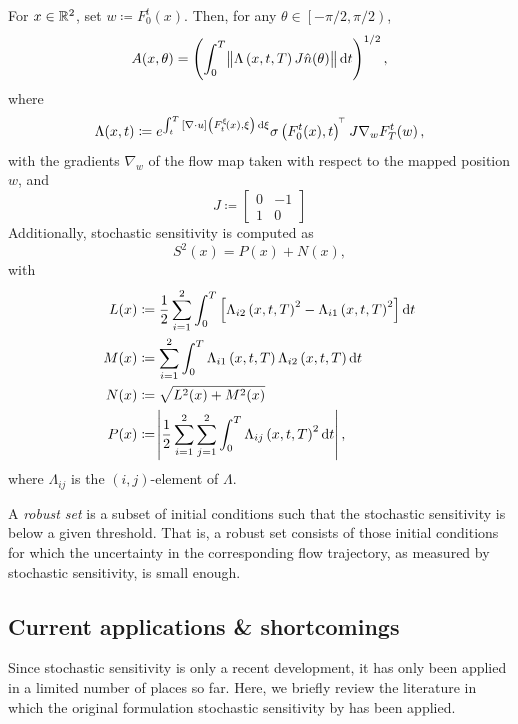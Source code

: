 \begin{theorem}\label{thm:orig_s2_calculation}
	For \(x \in \mathbb{R}^2\), set \(w \coloneqq F_0^t(x)\).
	Then, for any \(\theta \in \left[-\pi/2, \pi/2\right)\),
	\[
		A\!\left(x,\theta\right) = \left(\int_0^T{\norm{\Lambda\left(x, t, T\right)J\hat{n}\!\left(\theta\right)}\dif t}\right)^{1/2},
	\]
	where
	\[
		\Lambda\!\left(x,t\right) \coloneqq e^{\int_t^T{\left[\nabla \cdot u\right]\left(F_t^\xi\!\left(x\right), \xi\right)\dif\xi}}\sigma\left(F_0^t(x), t\right)^{\T}J \nabla_w F_T^t\!\left(w\right),
	\]
	with the gradients \(\nabla_w\) of the flow map taken with respect to the mapped position \(w\), and
	\[
		J \coloneqq \begin{bmatrix}
			0 & -1 \\
			1 & 0
		\end{bmatrix}
	\]
	Additionally, stochastic sensitivity is computed as
	\[
		S^2(x) = P(x) + N(x),
	\]
	with
	\begin{align*}
		L(x) & \coloneqq \frac12\sum_{i=1}^2\int_0^T\left[\Lambda_{i2}\left(x,t, T\right)^2 - \Lambda_{i1}\left(x,t,T\right)^2\right]\dif t \\
		M(x) & \coloneqq \sum_{i=1}^2\int_0^T{\Lambda_{i1}\left(x,t,T\right)\Lambda_{i2}\left(x,t,T\right)\dif t}                           \\
		N(x) & \coloneqq \sqrt{L^2(x) + M^2(x)}                                                                                             \\
		P(x) & \coloneqq \abs{\frac12\sum_{i=1}^2\sum_{j=1}^2{\int_0^T{\Lambda_{ij}\left(x,t,T\right)^2\dif t}}},
	\end{align*}
	where \(\Lambda_{ij}\) is the \((i,j)\)-element of \(\Lambda\).
\end{theorem}



A \emph{robust set} is a subset of initial conditions such that the stochastic sensitivity is below a given threshold.
That is, a robust set consists of those initial conditions for which the uncertainty in the corresponding flow trajectory, as measured by stochastic sensitivity, is small enough.



\subsection{Current applications \& shortcomings}
Since stochastic sensitivity is only a recent development, it has only been applied in a limited number of places so far.
Here, we briefly review the literature in which the original formulation stochastic sensitivity by \citet{Balasuriya_2020_StochasticSensitivityComputable} has been applied.

